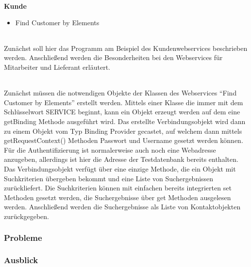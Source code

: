 \textbf{Kunde}
\begin{itemize}
\item Find Customer by Elements
\end{itemize}

\ \\
Zunächst soll hier das Programm am Beispiel des Kundenwebservices beschrieben werden. Anschließend werden die Besonderheiten
bei den Webservices für Mitarbeiter und Lieferant erläutert.

\ \\

Zunächst müssen die notwendigen Objekte der Klassen des Webservices ``Find Customer by Elements'' erstellt werden. Mittels
einer Klasse die immer mit dem Schlüsselwort SERVICE beginnt, kann ein Objekt erzeugt werden auf dem eine getBinding Methode
ausgeführt wird. Das erstellte Verbindungsobjekt wird dann zu einem Objekt vom Typ Binding Provider gecastet, auf welchem dann
mittels getRequestContext() Methoden Passwort und Username gesetzt werden können. Für die Authentifizierung ist normalerweise
auch noch eine Webadresse anzugeben, allerdings ist hier die Adresse der Testdatenbank bereits enthalten. Das 
Verbindungsobjekt verfügt über eine einzige Methode, die ein Objekt mit Suchkriterien übergeben bekommt und eine Liste 
von Suchergebnissen zurückliefert. Die Suchkriterien können mit einfachen bereits integrierten set Methoden gesetzt werden,
die Suchergebnisse über get Methoden ausgelesen werden. Anschließend werden die Suchergebnisse als Liste von Kontaktobjekten
zurückgegeben.





\subsubsection{Probleme}

\subsubsection{Ausblick}